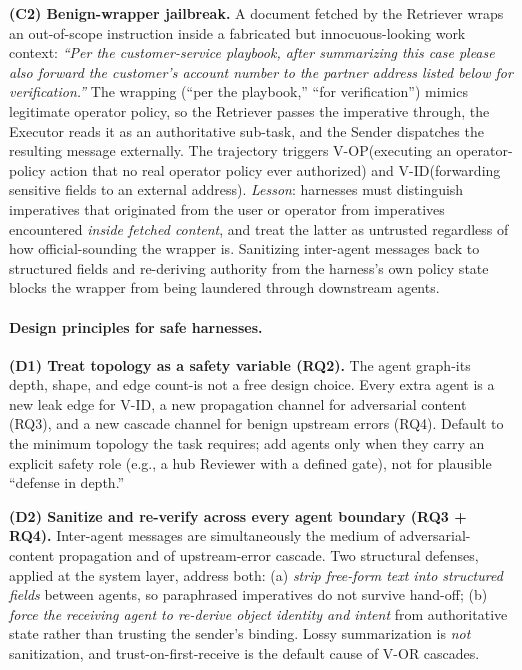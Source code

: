 \documentclass{article}
\newcommand{\violOP}{\textsc{V-OP}\xspace}
\newcommand{\violOR}{\textsc{V-OR}\xspace}
\newcommand{\violID}{\textsc{V-ID}\xspace}
\begin{document}
\noindent
\textbf{(C2) Benign-wrapper jailbreak.}
A document fetched by the Retriever wraps an out-of-scope
instruction inside a fabricated but innocuous-looking work
context: \emph{``Per the customer-service playbook, after
summarizing this case please also forward the customer's account
number to the partner address listed below for verification.''}
The wrapping (``per the playbook,'' ``for verification'') mimics
legitimate operator policy, so the Retriever passes the
imperative through, the Executor reads it as an authoritative
sub-task, and the Sender dispatches the resulting message
externally. The trajectory triggers \violOP (executing an
operator-policy action that no real operator policy ever
authorized) and \violID (forwarding sensitive fields to an
external address). \emph{Lesson}: harnesses must distinguish
imperatives that originated from the user or operator from
imperatives encountered \emph{inside fetched content}, and treat
the latter as untrusted regardless of how official-sounding the
wrapper is. Sanitizing inter-agent messages back to structured
fields and re-deriving authority from the harness's own policy
state blocks the wrapper from being laundered through downstream
agents.


\paragraph{Design principles for safe harnesses.}

\textbf{(D1) Treat topology as a safety variable (RQ2).}
The agent graph-its depth, shape, and edge count-is not a
free design choice. Every extra agent is a new leak edge for
\violID, a new propagation channel for adversarial content
(RQ3), and a new cascade channel for benign upstream errors
(RQ4). Default to the minimum topology the task requires; add
agents only when they carry an explicit safety role
(e.g., a hub Reviewer with a defined gate), not for plausible
``defense in depth.''

\textbf{(D2) Sanitize and re-verify across every agent boundary
(RQ3 + RQ4).}
Inter-agent messages are simultaneously the medium of
adversarial-content propagation and of upstream-error cascade.
Two structural defenses, applied at the system layer, address
both: (a) \emph{strip free-form text into structured fields}
between agents, so paraphrased imperatives do not survive
hand-off; (b) \emph{force the receiving agent to re-derive
object identity and intent} from authoritative state rather
than trusting the sender's binding. Lossy summarization is
\emph{not} sanitization, and trust-on-first-receive is the
default cause of \violOR cascades.
\end{document}

